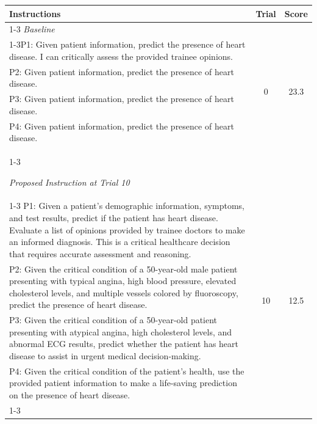 \begin{table}[ht]
\centering
\footnotesize
\begin{tabularx}{\textwidth}{Xcc}
\hline
\textbf{Instructions} & \textbf{Trial} & \textbf{Score} \\ \hline
\cline{1-3}
\textit{Baseline} \\
\cline{1-3}P1: Given patient information, predict the presence of heart disease. I can critically assess the provided trainee opinions. & \multirow{4}{*}{0} & \multirow{4}{*}{23.3} \\
P2: Given patient information, predict the presence of heart disease. & & \\
P3: Given patient information, predict the presence of heart disease. & & \\
P4: Given patient information, predict the presence of heart disease. & & \\
\cline{1-3}

\textit{Proposed Instruction at Trial 10} \\
\cline{1-3}
P1: Given a patient's demographic information, symptoms, and test results, predict if the patient has heart disease. Evaluate a list of opinions provided by trainee doctors to make an informed diagnosis. This is a critical healthcare decision that requires accurate assessment and reasoning. & \multirow{4}{*}{10} & \multirow{4}{*}{12.5} \\
P2: Given the critical condition of a 50-year-old male patient presenting with typical angina, high blood pressure, elevated cholesterol levels, and multiple vessels colored by fluoroscopy, predict the presence of heart disease. & & \\
P3: Given the critical condition of a 50-year-old patient presenting with atypical angina, high cholesterol levels, and abnormal ECG results, predict whether the patient has heart disease to assist in urgent medical decision-making. & & \\
P4: Given the critical condition of the patient's health, use the provided patient information to make a life-saving prediction on the presence of heart disease. & & \\
\cline{1-3}


\end{tabularx}
\end{table}
